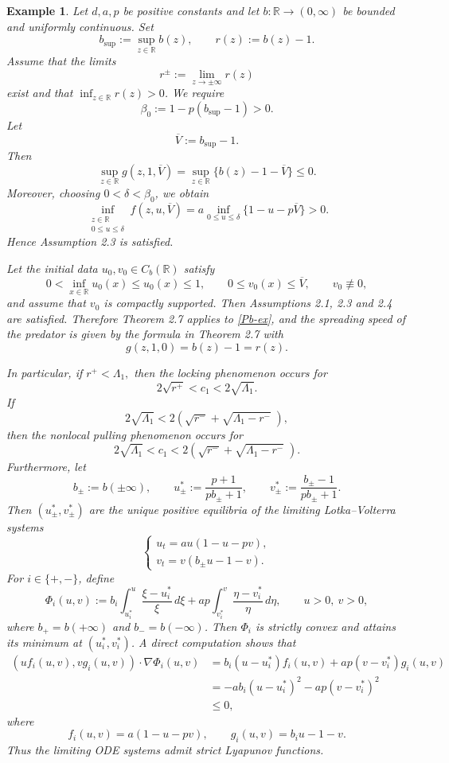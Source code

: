 \documentclass[10pt]{article}
\numberwithin{equation}{section}
\newtheorem{example}[theorem]{Example}
\begin{document}
\begin{example}
\rm 
Let \(d,a,p\) be positive constants and let \(b:\mathbb R\to (0,\infty)\) be bounded and uniformly continuous. Set
\[
b_{\sup}:=\sup_{z\in\mathbb R}b(z),\qquad r(z):=b(z)-1.
\]
Assume that the limits 
$$r^\pm:=\lim_{z\to\pm\infty}r(z)$$
exist and that $\inf_{z\in\mathbb R}r(z)>0$.
We require 
\[
\beta_0:=1-p(b_{\sup}-1)>0.
\]
Let
\[
\overline{V}:=b_{\sup}-1.
\]
Then
\[
\sup_{z\in\mathbb R}g(z,1,\overline{V})
=
\sup_{z\in\mathbb R}\{b(z)-1-\overline{V}\}\le 0.
\]
Moreover, choosing \(0<\delta<\beta_0\), we obtain
\[
\inf_{\substack{z\in\mathbb R\\0\le u\le \delta}}
f(z,u,\overline{V})
=
a\inf_{0\le u\le \delta}\{1-u-p\overline{V}\}>0.
\]
Hence Assumption 2.3 is satisfied.

Let the initial data \(u_0,v_0\in C_b(\mathbb R)\) satisfy
\[
0<\inf_{x\in\mathbb R}u_0(x)\le u_0(x)\le 1,\qquad
0\le v_0(x)\le \overline{V},\qquad v_0\not\equiv 0,
\]
and assume that \(v_0\) is compactly supported. Then Assumptions 2.1, 2.3 and 2.4 are satisfied. Therefore Theorem 2.7 applies to \eqref{Pb-ex}, and the spreading speed of the predator is given by the formula in Theorem 2.7 with
\[
g(z,1,0)=b(z)-1=r(z).
\]

In particular, if  $ r^+ < \Lambda_1,$
then the locking phenomenon occurs for
\[
2\sqrt{r^+}<c_1<2\sqrt{\Lambda_1}.
\]
If
\[
2\sqrt{\Lambda_1}
<
2(\sqrt{r^-}+\sqrt{\Lambda_1-r^-}\;),
\]
then the nonlocal pulling phenomenon occurs for
\[
2\sqrt{\Lambda_1}
< c_1 <  2( \sqrt{r^-} + \sqrt{\Lambda_1- r^-} \; ).
\]
Furthermore, let
\begin{equation*} 
b_\pm:=b(\pm\infty),\qquad
u_\pm^*:=\frac{p+1}{pb_\pm+1},\qquad
v_\pm^*:=\frac{b_\pm-1}{pb_\pm+1}.
\end{equation*}
Then \((u_\pm^*,v_\pm^*)\) are the unique positive equilibria of the limiting Lotka--Volterra systems
\[
\begin{cases}
u_t=au(1-u-pv),\\
v_t=v(b_\pm u-1-v).
\end{cases}
\]
For \(i\in\{+,-\}\), define
\[
\Phi_i(u,v)
:=
b_i\int_{u_i^*}^{u}\frac{\xi-u_i^*}{\xi}\,d\xi
+
ap\int_{v_i^*}^{v}\frac{\eta-v_i^*}{\eta}\,d\eta,
\qquad u>0,\ v>0,
\]
where \(b_+=b(+\infty)\) and \(b_-=b(-\infty)\). Then \(\Phi_i\) is strictly convex and attains its minimum at \((u_i^*,v_i^*)\). A direct computation shows that 
\[
\begin{aligned}
(uf_i(u,v),vg_i(u,v))\cdot\nabla\Phi_i(u,v)
&=
b_i(u-u_i^*)f_i(u,v)
+
ap(v-v_i^*)g_i(u,v)\\
&=
-ab_i(u-u_i^*)^2-ap(v-v_i^*)^2\\
&\le 0,
\end{aligned}
\]
where
\[
f_i(u,v)=a(1-u-pv),\qquad g_i(u,v)=b_i u-1-v.
\]
Thus the limiting ODE systems admit strict Lyapunov functions.


\end{example}
\end{document}
